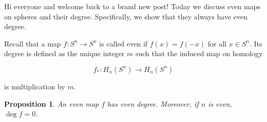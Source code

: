 \documentclass[a4paper, 12pt]{article}
\theoremstyle{definition}
\theoremstyle{plain}
\newtheorem{proposition}[definition]{Proposition}
\theoremstyle{remark}
\begin{document}
Hi everyone and welcome back to a brand new post! Today we discuss even maps on spheres and their degree. Specifically, we show that they always have even degree.

Recall that a map \( f \colon S^n \to S^n \) is called even if \( f(x) = f(-x) \) for all \( x \in S^n \). Its degree is defined as the unique integer \( m \) such that the induced map on homology

\begin{equation*}
    f_* \colon H_n(S^n) \to H_n(S^n)
\end{equation*}

is multiplication by \( m \).

\begin{proposition}
    An even map \( f \) has even degree. Moreover, if \( n \) is even, \( \deg f = 0 \).
\end{proposition}
\end{document}
